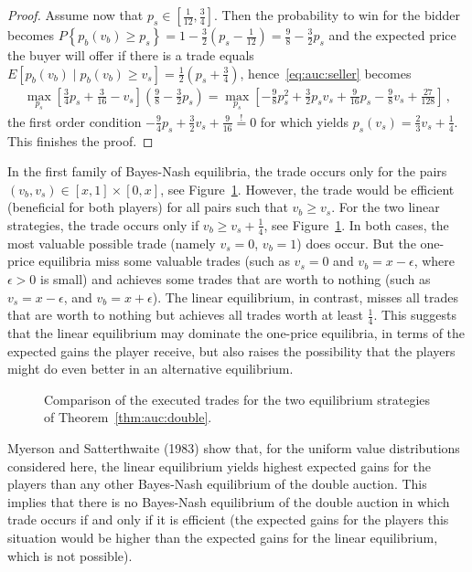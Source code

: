 \begin{proof}
Assume now that $p_s \in [\frac{1}{12},\frac{3}{4}]$.
Then the probability to win for the bidder becomes $P \left\{p_b(v_b) \geq p_s \right\} = 1 - \frac{3}{2}\left(p_s - \frac{1}{12} \right)=\frac{9}{8}- \frac{3}{2} p_s$ and the expected price the buyer will offer if there is a trade equals $E\left[p_b(v_b) \mid p_b(v_b) \geq v_s\right] = \frac{1}{2}\left(p_s + \frac{3}{4} \right)$, hence~\eqref{eq:auc:seller} becomes
\begin{align*}
 \max_{p_s} \left[\frac{3}{4}p_s + \frac{3}{16}  - v_s \right] \left(\frac{9}{8} - \frac{3}{2} p_s \right) =  \max_{p_s} \left[-\frac{9}{8} p_s^2 + \frac{3}{2} p_s v_s + \frac{9}{16} p_s - \frac{9}{8} v_s +  \frac{27}{128} \right]\,,
\end{align*} 
the first order condition $-\frac{9}{4} p_s + \frac{3}{2} v_s + \frac{9}{16} \stackrel{!}{=} 0$ for which yields $p_s(v_s) = \frac{2}{3} v_s + \frac{1}{4}$. This finishes the proof.
\end{proof}

In the first family of Bayes-Nash equilibria, the trade occurs only for the pairs $(v_b,v_s) \in [x,1] \times [0,x]$, see Figure~\ref{fig:auc:trade}. However, the trade would be efficient (beneficial for both players) for all pairs such that $v_b \geq v_s$. For the two linear strategies, the trade occurs only if $v_b \geq v_s + \frac{1}{4}$, see Figure~\ref{fig:auc:trade}.
In both cases, the most valuable possible trade (namely $v_s = 0$, $v_b = 1$) does occur. But the one-price equilibria miss some valuable trades (such as $v_s = 0$ and $v_b = x-\epsilon$, where $\epsilon > 0$ is small) and achieves some trades that are worth to nothing (such as $v_s = x- \epsilon$, and $v_b = x + \epsilon$). The linear equilibrium, in contrast, misses all trades that are worth to nothing but achieves all trades worth at least $\frac{1}{4}$. This suggests that the linear equilibrium may dominate the one-price equilibria, in terms of the expected gains the player receive, but also raises the possibility that the players might do even better in an alternative equilibrium.

\begin{figure}[h!t]
\hfill  \hfill\null
\caption{Comparison of the executed trades for the two equilibrium strategies of Theorem~\ref{thm:auc:double}.}
\label{fig:auc:trade}
\end{figure}

Myerson and Satterthwaite (1983) show that, for the uniform value distributions considered here, the linear equilibrium yields highest expected gains for the players than any other Bayes-Nash equilibrium of the double auction. This implies that there is no Bayes-Nash equilibrium of the double auction in which trade occurs if and only if it is efficient (the expected gains for the players this situation would be higher than the expected gains for the linear equilibrium, which is not possible).



\ifx \globalmark \undefined %


	
\else 
	
\fi